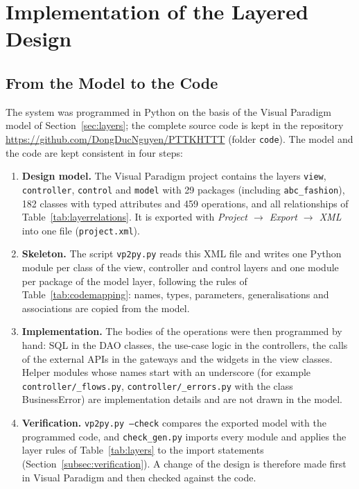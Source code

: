 \section{Implementation of the Layered Design}
\label{sec:code}

\subsection{From the Model to the Code}
\label{subsec:forward}
The system was programmed in Python on the basis of the Visual Paradigm model of Section~\ref{sec:layers}; the complete source code is kept in the repository \url{https://github.com/DongDucNguyen/PTTKHTTT} (folder \texttt{code}). The model and the code are kept consistent in four steps:
\begin{enumerate}
  \item \textbf{Design model.} The Visual Paradigm project contains the layers \texttt{view}, \texttt{controller}, \texttt{control} and \texttt{model} with 29 packages (including \texttt{abc\_fashion}), 182 classes with typed attributes and 459 operations, and all relationships of Table~\ref{tab:layerrelations}. It is exported with \emph{Project $\rightarrow$ Export $\rightarrow$ XML} into one file (\texttt{project.xml}).
  \item \textbf{Skeleton.} The script \texttt{vp2py.py} reads this XML file and writes one Python module per class of the view, controller and control layers and one module per package of the model layer, following the rules of Table~\ref{tab:codemapping}: names, types, parameters, generalisations and associations are copied from the model.
  \item \textbf{Implementation.} The bodies of the operations were then programmed by hand: SQL in the DAO classes, the use-case logic in the controllers, the calls of the external APIs in the gateways and the widgets in the view classes. Helper modules whose names start with an underscore (for example \texttt{controller/\_flows.py}, \texttt{controller/\_errors.py} with the class \textsf{BusinessError}) are implementation details and are not drawn in the model.
  \item \textbf{Verification.} \texttt{vp2py.py --check} compares the exported model with the programmed code, and \texttt{check\_gen.py} imports every module and applies the layer rules of Table~\ref{tab:layers} to the import statements (Section~\ref{subsec:verification}). A change of the design is therefore made first in Visual Paradigm and then checked against the code.
\end{enumerate}

